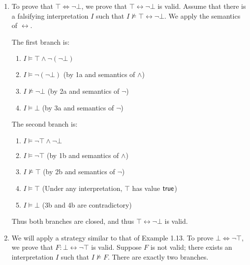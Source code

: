 \begin{exer}[1.2]
    $ $
    \begin{enumerate}[label=(\alph*)]
        \item
            To prove that $\top \Leftrightarrow \neg \bot$, we prove that $\top \leftrightarrow \neg \bot$ is valid.
            Assume that there is a falsifying interpretation $I$ such that $I \not\models \top \leftrightarrow \neg \bot$.
            We apply the semantics of $\leftrightarrow$.

            The first branch is:
            \begin{enumerate}[label=\arabic*a.]
                \item %
                    $I \models \top \land \neg(\neg \bot)$ 
                \item %
                    $I \models \neg(\neg \bot)$ (by 1a and semantics of $\land$)
                \item %
                    $I \not\models \neg \bot$ (by 2a and semantics of $\neg$)
                \item %
                    $I \models \bot$ (by 3a and semantics of $\neg$)
            \end{enumerate}

            The second branch is:
            \begin{enumerate}[label=\arabic*b.]
                \item %
                    $I \models \neg \top \land \neg \bot$ 
                \item %
                    $I \models \neg \top$ (by 1b and semantics of $\land$)
                \item %
                    $I \not\models \top$ (by 2b and semantics of $\neg$)
                \item %
                    $I \models \top$ (Under any interpretation, $\top$ has value $\operatorname{\textsf{true}}$)
                \item %
                    $I \models \bot$ (3b and 4b are contradictory)
            \end{enumerate}
            Thus both branches are closed, and thus $\top \leftrightarrow \neg \bot$ is valid.
        \item
            We will apply a strategy similar to that of Example 1.13.
            To prove $\bot \Leftrightarrow \neg \top$, we prove that $F: \bot \leftrightarrow \neg \top$ is valid.
            Suppose $F$ is not valid; there exists an interpretation $I$ such that $I \not\models F$.
            There are exactly two branches.


\end{enumerate}
\end{exer}
